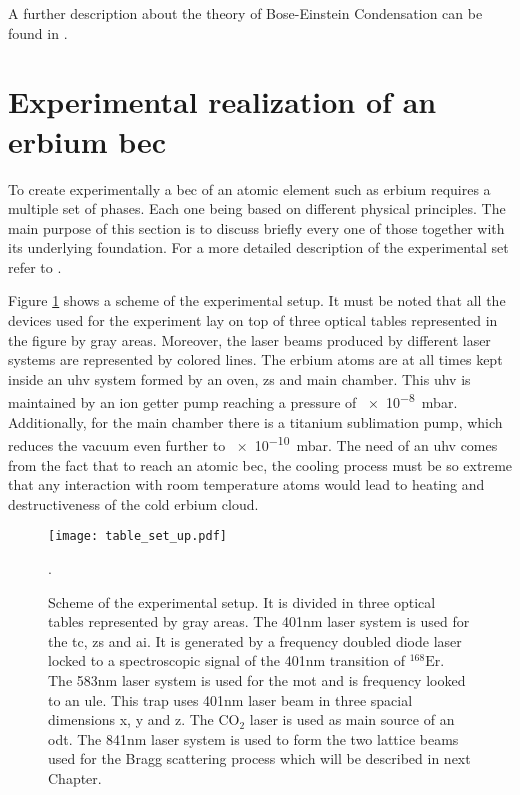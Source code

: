 A further description about the theory of Bose-Einstein Condensation can be found in \cite{Masahito2010, Pethick2008}.

\section{Experimental realization of an erbium \ac{bec}} \label{sec:experimental_preparation}

To create experimentally a \ac{bec} of an atomic element such as erbium requires a multiple set of phases. Each one being based on different physical principles. The main purpose of this section is to discuss briefly every one of those together with its underlying foundation. For a more detailed description of the experimental set refer to  \cite{Ulitzsch2016}. 

Figure \ref{fig:table_set_up} shows a scheme of the experimental setup. It must be noted that all the devices used for the experiment lay on top of three optical tables represented in the figure by gray areas. Moreover, the laser beams produced by different laser systems are represented by colored lines. The erbium atoms are at all times kept inside an \ac{uhv} system formed by an oven, \ac{zs} and main chamber. This \ac{uhv} is maintained by an ion getter pump reaching a pressure of \SI{e-8}{\milli\bar}. Additionally, for the main chamber there is a titanium sublimation pump, which reduces the vacuum even further to \SI{e-10}{\milli\bar}. The need of an \ac{uhv} comes from the fact that to reach an atomic \ac{bec}, the cooling process must be so extreme that any interaction with room temperature atoms would lead to heating and destructiveness of the cold erbium cloud.


\begin{figure}[!htbp]\centering
	\texttt{[image: table\_set\_up.pdf]}
	\caption[Scheme of the experimental setup]{Scheme of the experimental setup. It is divided in three optical tables represented by gray areas. The 401nm laser system is used for the \acf{tc}, \acf{zs} and \acf{ai}. It is generated by a frequency doubled diode laser locked to a spectroscopic signal of the 401nm transition of $^{\text{168}}\text{Er}$. The 583nm laser system is used for the \acf{mot} and is frequency looked to an \acf{ule}. This trap uses 401nm laser beam in three spacial dimensions x, y and z. The $\text{CO}_{2}$ laser is used as main source of an \acf{odt}. The 841nm laser system is used to form the two lattice beams used for the Bragg scattering process which will be described in next Chapter.}\label{fig:table_set_up}. 
\end{figure}

